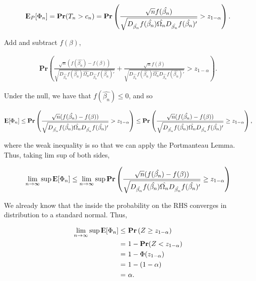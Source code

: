 \documentclass[12pt]{paper}
\newcommand{\E}{{\rm I\kern-.3em E}}
\begin{document}
\begin{align*}
\E_P[\Phi_n]=\textbf{Pr}(T_n>c_n)=\textbf{Pr}\left(\frac{\sqrt{n}f(\hat{\beta_n})}{\sqrt{D_{\hat{\beta_n}}f(\hat{\beta_n}) \hat{\Omega_n} D_{\hat{\beta_n}}f(\hat{\beta_n})'}}>z_{1-\alpha} \right).
\end{align*}

Add and subtract $f(\beta)$,

\begin{align*}
\textbf{Pr}\left(
\frac{\sqrt{n}(f(\hat{\beta_n})-f(\beta))}{\sqrt{D_{\hat{\beta_n}}f(\hat{\beta_n}) \hat{\Omega_n} D_{\hat{\beta_n}}f(\hat{\beta_n})'}}
+
\frac{\sqrt{n}f(\beta)}{\sqrt{D_{\hat{\beta_n}}f(\hat{\beta_n}) \hat{\Omega_n} D_{\hat{\beta_n}}f(\hat{\beta_n})'}}
>
z_{1-\alpha}
\right).
\end{align*}

Under the null, we have that $f(\hat{\beta_n})\leq0$, and so

\begin{align*}
\E[\Phi_n]
\leq
\textbf{Pr}\left(
\frac{\sqrt{n}(f(\hat{\beta_n})-f(\beta))}{\sqrt{D_{\hat{\beta_n}}f(\hat{\beta_n}) \hat{\Omega_n} D_{\hat{\beta_n}}f(\hat{\beta_n})'}}
>
z_{1-\alpha}
\right)
\leq
\textbf{Pr}\left(
\frac{\sqrt{n}(f(\hat{\beta_n})-f(\beta))}{\sqrt{D_{\hat{\beta_n}}f(\hat{\beta_n}) \hat{\Omega_n} D_{\hat{\beta_n}}f(\hat{\beta_n})'}}
\geq
z_{1-\alpha}
\right),
\end{align*}

where the weak inequality is so that we can apply the Portmanteau Lemma. Thus, taking lim sup of both sides,

\begin{align*}
\lim_{n \to \infty}\sup \E[\Phi_n] 
\leq
\lim_{n \to \infty} \sup \textbf{Pr}\left(
\frac{\sqrt{n}(f(\hat{\beta_n})-f(\beta))}{\sqrt{D_{\hat{\beta_n}}f(\hat{\beta_n}) \hat{\Omega_n} D_{\hat{\beta_n}}f(\hat{\beta_n})'}}
\geq
z_{1-\alpha}
\right)
\end{align*}

We already know that the inside the probability on the RHS converges in distribution to a standard normal. Thus,

\begin{align*}
\lim_{n \to \infty} \sup \E[\Phi_n]  \leq& ~\textbf{Pr}\left(Z \geq z_{1-\alpha} \right)\\
=&~1-\textbf{Pr}(Z<z_{1-\alpha})\\
=&~1-\Phi(z_{1-\alpha})\\
=&~1-(1-\alpha)\\
=&~\alpha.
\end{align*}
\end{document}
